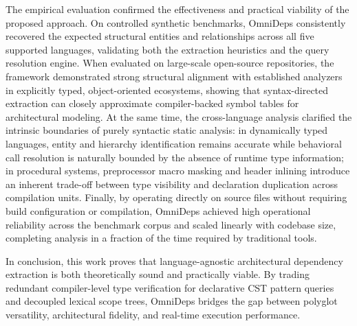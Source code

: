 The empirical evaluation confirmed the effectiveness and practical viability of
the proposed approach. On controlled synthetic benchmarks, OmniDeps consistently
recovered the expected structural entities and relationships across all five
supported languages, validating both the extraction heuristics and the query
resolution engine. When evaluated on large-scale open-source repositories, the
framework demonstrated strong structural alignment with established analyzers in
explicitly typed, object-oriented ecosystems, showing that syntax-directed
extraction can closely approximate compiler-backed symbol tables for
architectural modeling. At the same time, the cross-language analysis clarified
the intrinsic boundaries of purely syntactic static analysis: in dynamically
typed languages, entity and hierarchy identification remains accurate while
behavioral call resolution is naturally bounded by the absence of runtime type
information; in procedural systems, preprocessor macro masking and header
inlining introduce an inherent trade-off between type visibility and declaration
duplication across compilation units. Finally, by operating directly on source
files without requiring build configuration or compilation, OmniDeps achieved
high operational reliability across the benchmark corpus and scaled linearly
with codebase size, completing analysis in a fraction of the time required by
traditional tools.

In conclusion, this work proves that language-agnostic architectural dependency
extraction is both theoretically sound and practically viable. By trading
redundant compiler-level type verification for declarative CST pattern queries
and decoupled lexical scope trees, OmniDeps bridges the gap between polyglot
versatility, architectural fidelity, and real-time execution performance.
